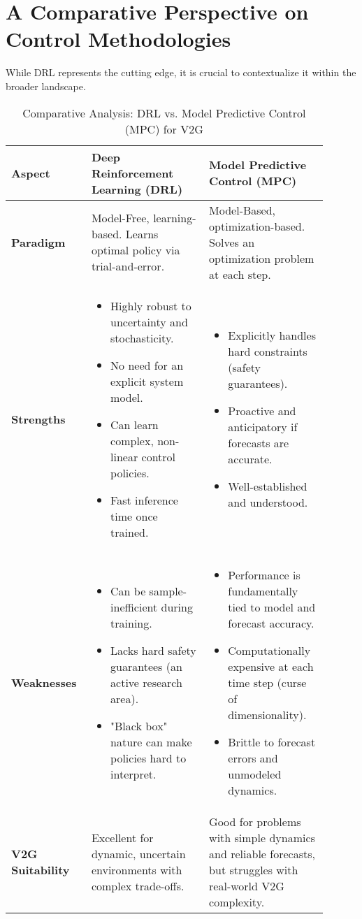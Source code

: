 \section{A Comparative Perspective on Control Methodologies}
While DRL represents the cutting edge, it is crucial to contextualize it within the broader landscape.

\begin{table}[h!]
\centering
\caption{Comparative Analysis: DRL vs. Model Predictive Control (MPC) for V2G}
\label{tab:drl_vs_mpc}
\begin{tabular}{|p{0.2\linewidth}|p{0.35\linewidth}|p{0.35\linewidth}|}
\hline
\textbf{Aspect} & \textbf{Deep Reinforcement Learning (DRL)} & \textbf{Model Predictive Control (MPC)} \\ \hline
\textbf{Paradigm} & Model-Free, learning-based. Learns optimal policy via trial-and-error. & Model-Based, optimization-based. Solves an optimization problem at each step. \\ \hline
\textbf{Strengths} & \begin{itemize} \item Highly robust to uncertainty and stochasticity. \item No need for an explicit system model. \item Can learn complex, non-linear control policies. \item Fast inference time once trained. \end{itemize} & \begin{itemize} \item Explicitly handles hard constraints (safety guarantees). \item Proactive and anticipatory if forecasts are accurate. \item Well-established and understood. \end{itemize} \\ \hline
\textbf{Weaknesses} & \begin{itemize} \item Can be sample-inefficient during training. \item Lacks hard safety guarantees (an active research area). \item "Black box" nature can make policies hard to interpret. \end{itemize} & \begin{itemize} \item Performance is fundamentally tied to model and forecast accuracy. \item Computationally expensive at each time step (curse of dimensionality). \item Brittle to forecast errors and unmodeled dynamics. \end{itemize} \\ \hline
\textbf{V2G Suitability} & Excellent for dynamic, uncertain environments with complex trade-offs. & Good for problems with simple dynamics and reliable forecasts, but struggles with real-world V2G complexity. \\ \hline
\end{tabular}
\end{table}
